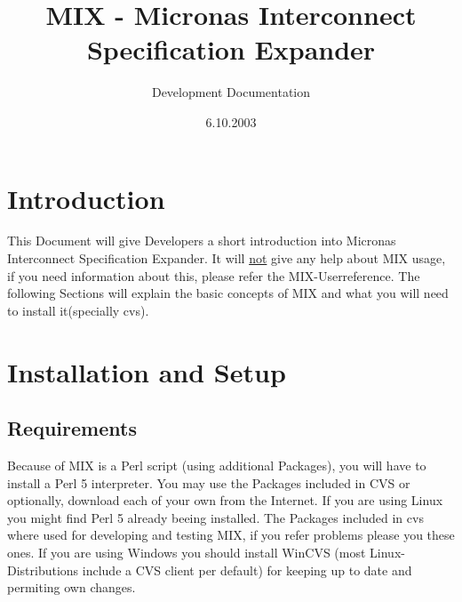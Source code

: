 \documentclass[a4paper,12pt]{article}
\title{MIX - Micronas Interconnect Specification Expander}
\author{Development Documentation}
\date{6.10.2003}
\begin{document}

\maketitle
\newpage

\tableofcontents
\newpage

\section{Introduction}
This Document will give Developers a short introduction into Micronas Interconnect Specification Expander. It will \underline{not} give any help about MIX usage, if you need information about this, please refer the MIX-Userreference. The following Sections will explain the basic concepts of MIX and what you will need to install it(specially cvs).

\section{Installation and Setup}
\subsection{Requirements}
Because of MIX is a Perl script (using additional Packages), you will have to install a Perl 5 interpreter. You may use the Packages included in CVS or optionally, download each of your own from the Internet. If you are using Linux you might find Perl 5 already beeing installed. The Packages included in cvs where used for developing and testing MIX, if you refer problems please you these ones. If you are using Windows you should install WinCVS (most Linux-Distributions include a CVS client per default) for keeping up to date and permiting own changes.
\end{document}
